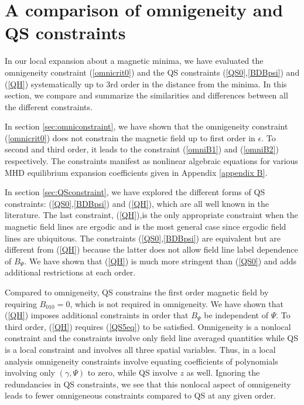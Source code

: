 \documentclass[aip,pop,reprint]{revtex4-1}
\newcommand*{\ep}{\epsilon}
\begin{document}
\section{A comparison of omnigeneity and QS constraints} \label{sec:comparison}
In our local expansion about a magnetic minima, we have evaluated the omnigeneity constraint (\ref{omnicrit0}) and the QS constraints (\ref{QS0},\ref{BDBpsi}) and (\ref{QH}) systematically up to 3rd order in the distance from the minima. In this section, we compare and summarize the similarities and differences between all the different constraints. 

In section \ref{sec:omniconstraint}, we have shown that the omnigeneity constraint (\ref{omnicrit0}) does not constrain the magnetic field up to first order in $\ep$. To second and third order, it leads to the constraint (\ref{omniB1}) and (\ref{omniB2}) respectively. The constraints manifest as nonlinear algebraic equations for various MHD equilibrium expansion coefficients given in Appendix \ref{appendix B}.

In section \ref{sec:QSconstraint}, we have explored the different forms of QS constraints: (\ref{QS0},\ref{BDBpsi}) and (\ref{QH}), which are all well known in the literature. The last constraint, (\ref{QH}),is the only appropriate constraint when the magnetic field lines are ergodic and is the most general case since ergodic field lines are ubiquitous. The constraints (\ref{QS0},\ref{BDBpsi}) are equivalent but are different from (\ref{QH}) because the latter does not allow field line label dependence of $B_\Psi$. We have shown that (\ref{QH}) is much more stringent than (\ref{QS0}) and adds additional restrictions at each order. 

Compared to omnigeneity, QS constrains the first order magnetic field by requiring $B_{010}=0$, which is not required in omnigeneity. We have shown that (\ref{QH}) imposes additional constraints in order that $B_\Psi$ be independent of $\Psi$. To third order, (\ref{QH}) requires (\ref{QS5eq}) to be satisfied. Omnigeneity is a nonlocal constraint and the constraints involve only field line averaged quantities while QS is a local constraint and involves all three spatial variables. Thus, in a local analysis omnigeneity constraints involve equating coefficients of polynomials involving only $(\gamma,\Psi)$ to zero, while QS involve $z$ as well. Ignoring the redundancies in QS constraints, we see that this nonlocal aspect of omnigeneity leads to fewer omnigeneous constraints compared to QS at any given order.
\end{document}
